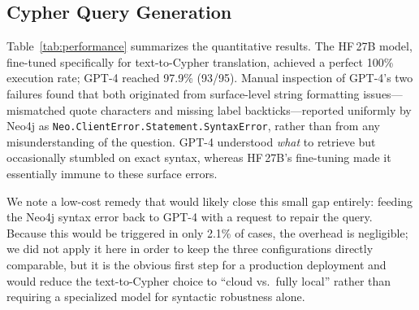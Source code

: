\documentclass{ceurart}
\begin{document}
\subsection{Cypher Query Generation}
\label{sec:cypher}

Table~\ref{tab:performance} summarizes the quantitative results. The HF\,27B
model, fine-tuned specifically for text-to-Cypher translation, achieved a perfect
100\% execution rate; GPT-4 reached 97.9\% (93/95). Manual inspection of GPT-4's
two failures found that both originated from surface-level string formatting
issues---mismatched quote characters and missing label backticks---reported
uniformly by Neo4j as \texttt{Neo.ClientError.Statement.SyntaxError}, rather than
from any misunderstanding of the question. GPT-4 understood \emph{what} to retrieve
but occasionally stumbled on exact syntax, whereas HF\,27B's fine-tuning made it
essentially immune to these surface errors.

We note a low-cost remedy that would likely close this small gap entirely: feeding
the Neo4j syntax error back to GPT-4 with a request to repair the query. Because
this would be triggered in only 2.1\% of cases, the overhead is negligible; we did
not apply it here in order to keep the three configurations directly comparable,
but it is the obvious first step for a production deployment and would reduce the
text-to-Cypher choice to ``cloud vs.\ fully local'' rather than requiring a
specialized model for syntactic robustness alone.
\end{document}

